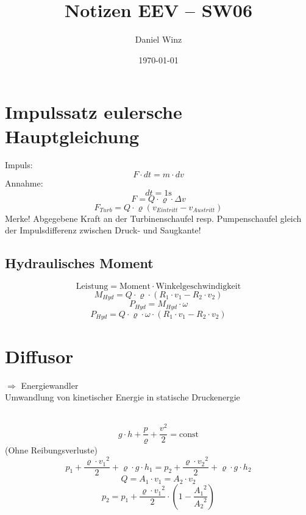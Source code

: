 \documentclass[a4,paper,fleqn]{article}
\title{Notizen EEV -- SW06}
\date{\today}
\author{Daniel Winz}
\begin{document}
\maketitle
\clearpage

\section{Impulssatz eulersche Hauptgleichung}
Impuls: 
\[ F \cdot dt = m \cdot dv \]
Annahme: 
\[ dt = 1 \si{\second} \]
\[ F = Q \cdot \varrho \cdot \Delta v \]
\[ F_{Turb} = Q \cdot \varrho (v_{Eintritt} - v_{Austritt}) \]
Merke! Abgegebene Kraft an der Turbinenschaufel resp. Pumpenschaufel gleich 
der Impulsdifferenz zwischen Druck- und Saugkante! 

\subsection{Hydraulisches Moment}
\[ \text{Leistung} = \text{Moment} \cdot \text{Winkelgeschwindigkeit} \]
\[ M_{Hyd} = Q \cdot \varrho \cdot (R_1 \cdot v_1 - R_2 \cdot v_2) \]
\[ P_{Hyd} = M_{Hyd} \cdot \omega \]
\[ P_{Hyd} = Q \cdot \varrho \cdot \omega \cdot (R_1 \cdot v_1 - R_2 \cdot v_2) \]

\section{Diffusor}
$\Rightarrow$ Energiewandler \\
Umwandlung von kinetischer Energie in statische Druckenergie
\\
\\
\[ g \cdot h + \frac{p}{\varrho} + \frac{v^2}{2} = \text{const} \]
(Ohne Reibungsverluste)
\[ p_1 + \frac{\varrho \cdot {v_1}^2}{2} + \varrho \cdot g \cdot h_1 
= p_2 + \frac{\varrho \cdot {v_2}^2}{2} + \varrho \cdot g \cdot h_2  \]
\[ Q = A_1 \cdot v_1 = A_2 \cdot v_2 \]
\[ p_2 = p_1 + \frac{\varrho \cdot {v_1}^2}{2} \cdot \left( 1 - \frac{{A_1}^2}{{A_2}^2} \right) \]
\end{document}
